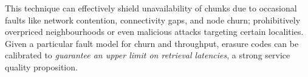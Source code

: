 This technique can effectively shield unavailability of chunks due to occasional faults like network contention, connectivity gaps, and node churn; prohibitively overpriced neighbourhoods or even malicious attacks targeting certain localities. Given a particular fault model for churn and throughput, erasure codes can be calibrated to
\emph{guarantee an upper limit on retrieval latencies}, a strong service quality proposition.

